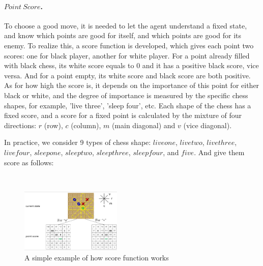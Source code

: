 \documentclass[final]{cvpr}
\newcommand{\mypara}[1]{\paragraph{#1.}}
\begin{document}
\mypara{$Point\ Score$}
To choose a good move, it is needed to let the agent understand a fixed state, and know which points are good for itself, and which points are good for its enemy.
%
To realize this, a score function is developed, which gives each point two scores: one for black player, another for white player.
%
For a point already filled with black chess, its white score equals to 0 and it has a positive black score, vice versa.
%
And for a point empty, its white score and black score are both positive.
%
As for how high the score is, it depends on the importance of this point for either black or white, and the degree of importance is measured by the specific chess shapes, for example, 'live three', 'sleep four', etc.
%
Each shape of the chess has a fixed score, and a score for a fixed point is calculated by the mixture of four directions: $r$ (row), $c$ (column), $m$ (main diagonal) and $v$ (vice diagonal).
%
\par In practice, we consider 9 types of chess shape: $live one$, $live two$, $live three$, $live four$, $sleep one$, $sleep two$, $sleep three$, $sleep four$, and $five$. And give them score as follows:
%
\begin{table}[!htbp]
\centering
\label{table1} 
\caption{Scores for different chess shape} 
\end{table}\\
%
\begin{figure}[h]
\centering 
\includegraphics[width=0.43\textwidth]{figures/pic1.png} 
\caption{A simple example of how score function works} 
\label{Fig.main1} %
\end{figure}
%
\end{document}
